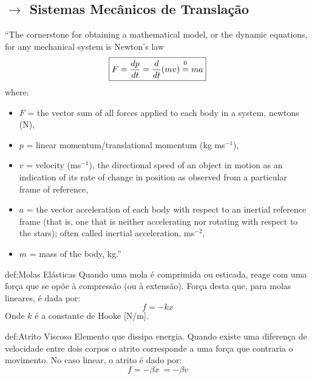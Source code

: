 \def\equalfootnote{\mathrel{\ensurestackMath{\stackon[1pt]{=}{\footnotemark[0]}}}}
\label{sec:mechanics}
\subsection[3.1 Sistemas Mecânicos de Translação]{$\rightarrow$ Sistemas Mecânicos de Translação}
\label{sec:mechanics-translation}

``The cornerstone for obtaining a mathematical model, or the dynamic equations, for any mechanical system is Newton's law
$$
    \boxed{F = \frac{dp}{dt} = \frac{d}{dt} (m v) \equalfootnote ma}
$$
\noindent where:
\begin{itemize}
    \item $F$ = the vector sum of all forces applied to each body in a system, newtons (N),
    \item $p$ = linear momentum/translational momentum (kg ms$^{-1}$),
    \item $v$ = velocity (ms$^{-1}$), the directional speed of an object in motion as an indication of its rate of change in position as observed from a particular frame of reference,
    \item $a$ = the vector acceleration of each body with respect to an inertial reference frame (that is, one that is neither accelerating nor rotating with respect to the stars); often called inertial acceleration, ms$^{-2}$,
    \item $m$ = mass of the body, kg.''\cite{FranklinPowell2015}
\end{itemize}


\renewcommand*{\thefootnote}{\fnsymbol{footnote}}
\begin{theo}{def:Molas Elásticas}\label{def:MolasElásticas}
Quando uma mola é comprimida ou esticada, reage com uma força que se opõe à compressão (ou à extensão). Força desta que, para molas lineares, é dada por:
$$
    f = -kx
$$
Onde $k$ é a constante de Hooke [N/m].
\end{theo}

\begin{theo}{def:Atrito Viscoso}\label{def:AtritoViscoso}
Elemento que dissipa energia. Quando existe uma diferença de velocidade entre dois corpos o atrito corresponde a uma força que contraria o movimento. No caso linear, o atrito é dado por:
$$
    f = -\beta\dot{x}\ = -\beta v 
$$
\end{theo}

